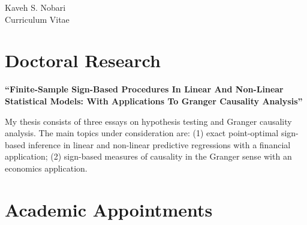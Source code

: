 \documentclass[10pt]{article} %
\begin{document}
\begin{paracol}{2} %


\parbox[top][0.12\textheight][c]{\linewidth}{ %
	\vspace{-0.04\textheight} %
	\centering %
	{\sffamily\Huge Kaveh S. Nobari}\\\medskip %
	{\Huge\color{headings}\cvtextfont Curriculum Vitae}
}


\section{Doctoral Research}

{\raggedright\textbf{\textquotedblleft Finite-Sample Sign-Based Procedures In Linear And Non-Linear Statistical Models: With Applications To Granger Causality Analysis\textquotedblright}\\\medskip}

My thesis consists of three essays on hypothesis testing and Granger cau\-sality analysis. The main topics under consideration are: (1) exact point-optimal sign-based inference in linear and non-linear predictive regre\-ssions with a financial application; (2) sign-based measures of causa\-lity in the Granger sense with an economics application. 

\medskip %


\section{Academic Appointments}


\end{paracol}
\end{document}
